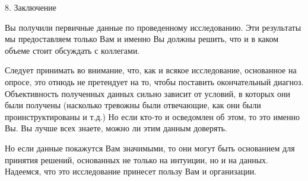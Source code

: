 \begin{frame}{8. Заключение}

\tiny 
Вы получили первичные данные по проведенному исследованию. Эти результаты мы предоставляем только Вам и именно Вы должны решить, что и в каком объеме стоит обсуждать с коллегами. 
\smallskip

Следует принимать во внимание, что, как и всякое исследование, основанное на опросе, это отнюдь не претендует на то, чтобы поставить окончательный диагноз. Объективность полученных данных сильно зависит от условий, в которых они были получены (насколько тревожны были отвечающие, как они были проинструктированы и т.д.) Но если кто-то и осведомлен об этом, то это именно Вы.  Вы лучше всех знаете, можно ли этим данным доверять.
\smallskip

Но  если данные покажутся Вам значимыми, то они могут быть основанием для принятия решений, основанных не только на интуиции, но и на данных. Надеемся, что это исследование принесет пользу Вам и организации.
\end{frame}



